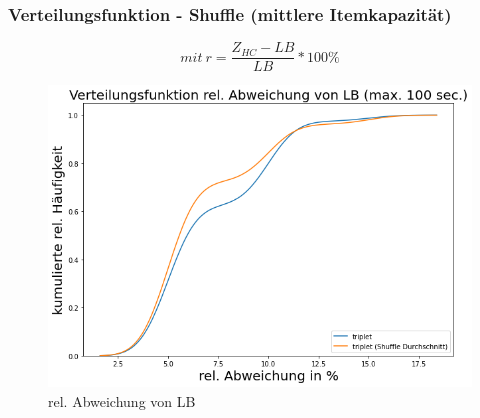 \documentclass{beamer}
\begin{document}
%
%
%
%
\begin{frame}

\frametitle{Verteilungsfunktion - Shuffle (mittlere Itemkapazität)}

\begin{footnotesize}
\begin{equation}
mit \ r = \frac{Z_{HC}-LB}{LB} * 100\%
\end{equation}
\end{footnotesize}

\begin{figure}[!htbp]
\begin{center}
\includegraphics[scale=0.3]{img/dist_trip2.png}
\end{center}
\caption{rel. Abweichung von LB}
\label{fig:architecture}
\end{figure}



\end{frame}
\end{document}
